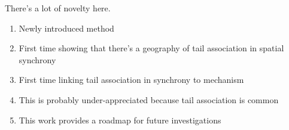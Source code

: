 \documentclass[12pt, oneside]{article}
\begin{document}
\noindent There's a lot of novelty here.
\begin{enumerate}
\item{Newly introduced method}
\item{First time showing that there's a geography of tail association in spatial synchrony}
\item{First time linking tail association in synchrony to mechanism}
\item{This is probably under-appreciated because tail association is common}
\item{This work provides a roadmap for future investigations}
\end{enumerate}



\end{document}
